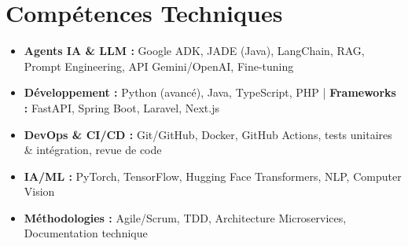 \documentclass[a4paper,11pt]{article}
\begin{document}
\section{Compétences Techniques}
\begin{itemize}[leftmargin=*, nosep]
    \item \small{\textbf{Agents IA \& LLM :} Google ADK, JADE (Java), LangChain, RAG, Prompt Engineering, API Gemini/OpenAI, Fine-tuning}
    \item \small{\textbf{Développement :} Python (avancé), Java, TypeScript, PHP | \textbf{Frameworks :} FastAPI, Spring Boot, Laravel, Next.js}
    \item \small{\textbf{DevOps \& CI/CD :} Git/GitHub, Docker, GitHub Actions, tests unitaires \& intégration, revue de code}
    \item \small{\textbf{IA/ML :} PyTorch, TensorFlow, Hugging Face Transformers, NLP, Computer Vision}
    \item \small{\textbf{Méthodologies :} Agile/Scrum, TDD, Architecture Microservices, Documentation technique}
\end{itemize}

\end{document}

